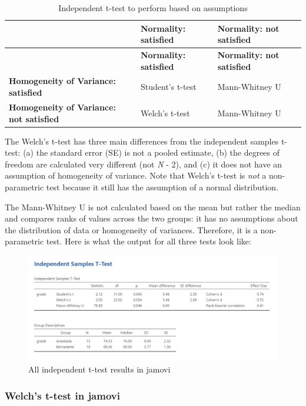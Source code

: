 \documentclass[
]{book}
\begin{document}
\begin{longtable}[]{@{}lll@{}}
\caption{Independent t-test to perform based on assumptions}\tabularnewline
\toprule
& \textbf{Normality: satisfied} & \textbf{Normality: not satisfied}\tabularnewline
\midrule
\endfirsthead
\toprule
& \textbf{Normality: satisfied} & \textbf{Normality: not satisfied}\tabularnewline
\midrule
\endhead
\textbf{Homogeneity of Variance: satisfied} & Student's t-test & Mann-Whitney U\tabularnewline
\textbf{Homogeneity of Variance: not satisfied} & Welch's t-test & Mann-Whitney U\tabularnewline
\bottomrule
\end{longtable}

The Welch's t-test has three main differences from the independent samples t-test: (a) the standard error (SE) is not a pooled estimate, (b) the degrees of freedom are calculated very different (not \emph{N} - 2), and (c) it does not have an assumption of homogeneity of variance. Note that Welch's t-test is \emph{not} a non-parametric test because it still has the assumption of a normal distribution.

The Mann-Whitney U is not calculated based on the mean but rather the median and compares ranks of values across the two groups: it has no assumptions about the distribution of data or homogeneity of variances. Therefore, it is a non-parametric test. Here is what the output for all three tests look like:

\begin{figure}

{\centering \includegraphics[width=1\linewidth]{images/02-independent_t-test/independent_t-test_full-results} 

}

\caption{All independent t-test results in jamovi}\label{fig:unnamed-chunk-11}
\end{figure}

\hypertarget{welchs-t-test-in-jamovi}{%
\subsubsection{Welch's t-test in jamovi}\label{welchs-t-test-in-jamovi}}
\end{document}
